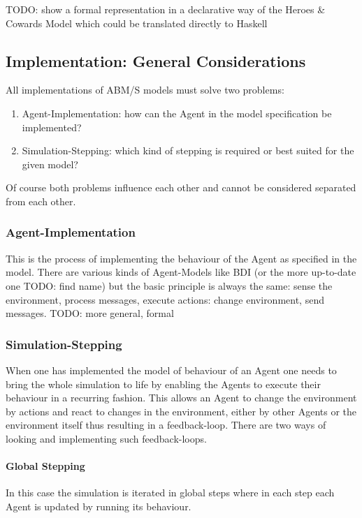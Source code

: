 TODO: show a formal representation in a declarative way of the Heroes \& Cowards Model which could be translated directly to Haskell

\subsection{Implementation: General Considerations}
All implementations of ABM/S models must solve two problems:

\begin{enumerate}
\item Agent-Implementation: how can the Agent in the model specification be implemented?
\item Simulation-Stepping: which kind of stepping is required or best suited for the given model?
\end{enumerate}

Of course both problems influence each other and cannot be considered separated from each other.

\subsubsection{Agent-Implementation}
This is the process of implementing the behaviour of the Agent as specified in the model. There are various kinds of Agent-Models like BDI (or the more up-to-date one TODO: find name) but the basic principle is always the same: sense the environment, process messages, execute actions: change environment, send messages. TODO: more general, formal

\subsubsection{Simulation-Stepping}
When one has implemented the model of behaviour of an Agent one needs to bring the whole simulation to life by enabling the Agents to execute their behaviour in a recurring fashion. This allows an Agent to change the environment by actions and react to changes in the environment, either by other Agents or the environment itself thus resulting in a feedback-loop. There are two ways of looking and implementing such feedback-loops. 

\paragraph{Global Stepping}
In this case the simulation is iterated in global steps where in each step each Agent is updated by running its behaviour.

